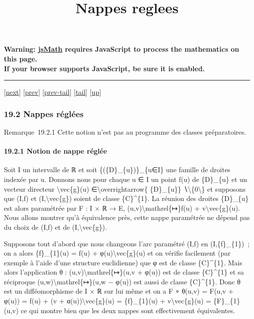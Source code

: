 \documentclass[]{article}
\title{Nappes reglees}
\author{}
\date{}
\begin{document}
\maketitle

\textbf{Warning: \href{http://www.math.union.edu/locate/jsMath}{jsMath}
requires JavaScript to process the mathematics on this page.\\ If your
browser supports JavaScript, be sure it is enabled.}

\begin{center}\rule{3in}{0.4pt}\end{center}

{[}\href{coursse102.html}{next}{]} {[}\href{coursse100.html}{prev}{]}
{[}\href{coursse100.html\#tailcoursse100.html}{prev-tail}{]}
{[}\hyperref[tailcoursse101.html]{tail}{]}
{[}\href{coursch20.html\#coursse101.html}{up}{]}

\subsubsection{19.2 Nappes réglées}

Remarque~19.2.1 Cette notion n'est pas au programme des classes
préparatoires.

\paragraph{19.2.1 Notion de nappe réglée}

Soit I un intervalle de ℝ et soit \{(\{D\}\_\{u\})\}\_\{u∈I\} une
famille de droites indexée par u. Donnons nous pour chaque u ∈ I un
point f(u) de \{D\}\_\{u\} et un vecteur directeur
\textbackslash{}vec\{g\}(u) ∈\textbackslash{}overrightarrow\{
\{D\}\_\{u\}\} ∖\textbackslash{}\{0\textbackslash{}\} et supposons que
(I,f) et (I,\textbackslash{}vec\{g\}) soient de classe \{C\}\^{}\{1\}.
La réunion des droites \{D\}\_\{u\} est alors paramétrée par F : I × ℝ →
E, (u,v)\textbackslash{}mathrel\{↦\}f(u) + v\textbackslash{}vec\{g\}(u).
Nous allons montrer qu'à équivalence près, cette nappe paramétrée ne
dépend pas du choix de (I,f) et de (I,\textbackslash{}vec\{g\}).

Supposons tout d'abord que nous changeons l'arc paramétré (I,f) en
(I,\{f\}\_\{1\})~; on a alors \{f\}\_\{1\}(u) = f(u) +
φ(u)\textbackslash{}vec\{g\}(u) et on vérifie facilement (par exemple à
l'aide d'une structure euclidienne) que φ est de classe \{C\}\^{}\{1\}.
Mais alors l'application θ : (u,v)\textbackslash{}mathrel\{↦\}(u,v +
φ(u)) est de classe \{C\}\^{}\{1\} et sa réciproque
(u,w)\textbackslash{}mathrel\{↦\}(u,w − φ(u)) est aussi de classe
\{C\}\^{}\{1\}. Donc θ est un difféomorphisme de I × ℝ sur lui même et
on a F ∘ θ(u,v) = F(u,v + φ(u)) = f(u) + (v +
α(u))\textbackslash{}vec\{g\}(u) = \{f\}\_\{1\}(u) +
v\textbackslash{}vec\{g\}(u) = \{F\}\_\{1\}(u,v) ce qui montre bien que
les deux nappes sont effectivement équivalentes.
\end{document}
